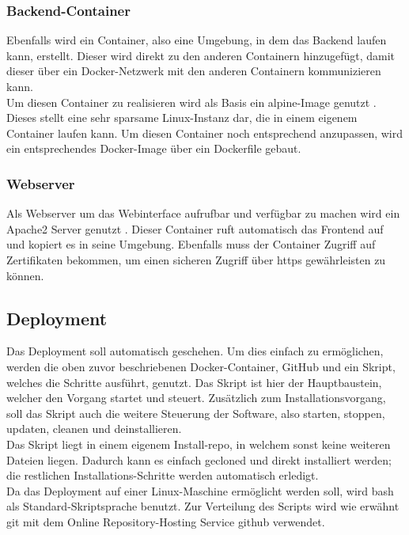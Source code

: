 		\subsubsection{Backend-Container}
		
		Ebenfalls wird ein Container, also eine Umgebung, in dem das Backend laufen kann, erstellt. Dieser wird direkt zu den anderen Containern hinzugefügt, damit dieser über ein Docker-Netzwerk mit den anderen Containern kommunizieren kann.~\\
		Um diesen Container zu realisieren wird als Basis ein alpine-Image genutzt \cite{alpine}. Dieses stellt eine sehr sparsame Linux-Instanz dar, die in einem eigenem Container laufen kann. Um diesen Container noch entsprechend anzupassen, wird ein entsprechendes Docker-Image über ein Dockerfile gebaut.
		
		\subsubsection{Webserver}
		
		Als Webserver um das Webinterface aufrufbar und verfügbar zu machen wird ein Apache2 Server genutzt \cite{apache}. Dieser Container ruft automatisch das Frontend auf und kopiert es in seine Umgebung. Ebenfalls muss der Container Zugriff auf Zertifikaten bekommen, um einen sicheren Zugriff über \gls{https} gewährleisten zu können.
				
	\subsection{Deployment}
	
	Das Deployment soll automatisch geschehen. Um dies einfach zu ermöglichen, werden die oben zuvor beschriebenen Docker-Container, GitHub und ein Skript, welches die Schritte ausführt, genutzt. Das Skript ist hier der Hauptbaustein, welcher den Vorgang startet und steuert. Zusätzlich zum Installationsvorgang, soll das Skript auch die weitere Steuerung der Software, also starten, stoppen, updaten, cleanen und deinstallieren.~\\
	Das Skript liegt in einem eigenem Install-\Gls{repo}, in welchem sonst keine weiteren Dateien liegen. Dadurch kann es einfach gecloned und direkt installiert werden; die restlichen Installations-Schritte werden automatisch erledigt.~\\
	Da das Deployment auf einer Linux-Maschine ermöglicht werden soll, wird \Gls{bash} als Standard-Skriptsprache benutzt. Zur Verteilung des Scripts wird wie erwähnt \Gls{git} mit dem Online Repository-Hosting Service \Gls{github} verwendet.
